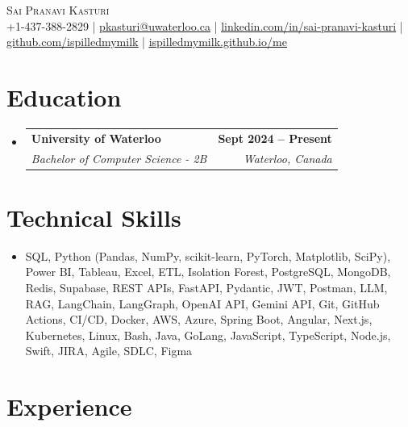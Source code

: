 \documentclass[letterpaper,10pt]{article}
\makeatletter
\newcommand{\resumeSubheading}[4]{
  \vspace{-1pt}\item
    \begin{tabular*}{1.0\textwidth}[t]{l@{\extracolsep{\fill}}r}
      \textbf{#1} & \textbf{\small #2} \\
      \textit{\small#3} & \textit{\small #4} \\[-2pt]
    \end{tabular*}\vspace{-7pt}
}
\newcommand{\resumeSubHeadingListStart}{\begin{itemize}[leftmargin=0.0in, label={}]}
\newcommand{\resumeSubHeadingListEnd}{\end{itemize}}
\makeatother
\begin{document}

\vspace{-28pt}
\begin{center}
    {\Huge \scshape Sai Pranavi Kasturi} \\ 
    
    \small +1-437-388-2829 | \underline{pkasturi@uwaterloo.ca} | \href{https://linkedin.com/in/sai-pranavi-kasturi-704807298}{\underline{linkedin.com/in/sai-pranavi-kasturi}} | \href{https://github.com/ispilledmymilk}{\underline{github.com/ispilledmymilk}} | \href{https://ispilledmymilk.github.io/me/}{\underline{ispilledmymilk.github.io/me}}
    \vspace{-10pt}
\end{center}

\vspace{-10pt}
\section{Education}
  \resumeSubHeadingListStart
    \resumeSubheading
      {University of Waterloo}{Sept 2024 -- Present}
      {Bachelor of Computer Science - 2B}{Waterloo, Canada}
  \resumeSubHeadingListEnd
\vspace{-8pt}
  

\section{Technical Skills}
\begin{itemize}[leftmargin=0.05in, label={}]
  \small\item{
    SQL, Python (Pandas, NumPy, scikit-learn, PyTorch, Matplotlib, SciPy), Power BI, Tableau, Excel, ETL, Isolation Forest, PostgreSQL, MongoDB, Redis, Supabase, REST APIs, FastAPI, Pydantic, JWT, Postman, LLM, RAG, LangChain, LangGraph, OpenAI API, Gemini API, Git, GitHub Actions, CI/CD, Docker, AWS, Azure, Spring Boot, Angular, Next.js, Kubernetes, Linux, Bash, Java, GoLang, JavaScript, TypeScript, Node.js, Swift, JIRA, Agile, SDLC, Figma
  }
\end{itemize}
 \vspace{-18pt}

\vspace{1.20pt}
\section{Experience}
\end{document}
